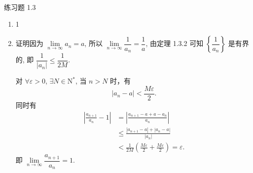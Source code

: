 


% 

\begin{center}
    {\heiti 练习题 1.3}
\end{center}

\begin{enumerate}
    \item 1
    \item
        {\heiti 证明}\quad 因为 $\lim\limits_{n\to\infty}a_n = a$, 所以 $\lim\limits_{n\to\infty}\dfrac{1}{a_n} = \dfrac 1a$,
        由定理 1.3.2 可知 $\left\{\dfrac{1}{a_n}\right\}$ 是有界的, 即 $\dfrac{1}{|a_n|}\leqslant\dfrac{1}{2M}$.
            
        对 $\forall \varepsilon > 0$, $\exists N \in \mathrm{N}^*$, 当 $n > N$ 时，有
        \begin{equation*}
            |a_n - a| < \frac{M\varepsilon}{2}.
        \end{equation*}
        同时有
        \begin{align*}
            \left| \frac{a_{n+1}}{a_n} - 1 \right| &= \left| \frac{a_{n+1} - a + a - a_n}{a_n} \right| \\
                                                   &\leqslant \frac{|a_{n+1} - a| + |a_n - a|}{|a_n|} \\
                                                   &< \frac{1}{2M}\left( \frac{M\varepsilon}{2} + \frac{M\varepsilon}{2} \right) = \varepsilon.
        \end{align*}
        即 $\lim\limits_{n\to\infty}\dfrac{a_{n+1}}{a_n} = 1$.
    

\end{enumerate}
